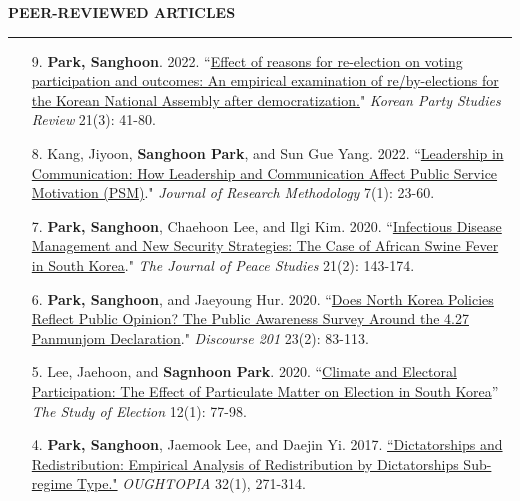 \documentclass[
  16,
]{article}
\begin{document}
\begin{large}{\bf PEER-REVIEWED ARTICLES}
  \vspace{3pt}
  \hrule
\end{large}
  \begin{itemize}
    \item[9.] \textbf{Park, Sanghoon}. 2022. ``\href{http://www.partystudies.or.kr/contents/bbs/bbs_list.html?bbs_cls_cd=004003}{Effect of reasons for re-election on voting participation and outcomes: An empirical examination of re/by-elections for the Korean National Assembly after democratization.}"  \textit{Korean Party Studies Review} 21(3): 41-80. 
\item[8.] Kang, Jiyoon, \textbf{Sanghoon Park}, and Sun Gue Yang. 2022. ``\href{http://basicdata.kr/board/read/journals/146/}{Leadership in Communication:
How Leadership and Communication Affect Public Service Motivation (PSM)}." \textit{Journal of Research Methodology} 7(1): 23-60.
\item[7.] \textbf{Park, Sanghoon}, Chaehoon Lee, and Ilgi Kim. 2020. ``\href{https://www.earticle.net/Journal/Issues/511/28448}{Infectious Disease Management and New Security Strategies: The Case of African Swine Fever in South Korea}." \textit{The Journal of Peace Studies} 21(2): 143-174.
\item[6.] \textbf{Park, Sanghoon}, and Jaeyoung Hur. 2020. ``\href{http://www.discourse201.org/html/sub05_01.asp}{Does North Korea Policies Reflect Public Opinion? The Public Awareness Survey Around the 4.27 Panmunjom Declaration}." \textit{Discourse 201} 23(2): 83-113.
\item[5.] Lee, Jaehoon, and \textbf{Sagnhoon Park}. 2020. ``\href{https://m.nec.go.kr/portal/cmm/fms/FileDown.do?atchFileId=5d0ffae936edc42f3b4e864801f86a0f4096c44da03fede418b94067e8f9d0ea&fileSn=1&bbsId=&searchYear=}{Climate and Electoral Participation: The Effect of Particulate Matter on Election in South Korea}'' \textit{The Study of Election} 12(1): 77-98.  
\item[4.] \textbf{Park, Sanghoon}, Jaemook Lee, and Daejin Yi. 2017. \href{http://www.dbpia.co.kr/Journal/ArticleDetail/NODE07183479?TotalCount=1&Seq=1&q=%5B%EB%8F%85%EC%9E%AC%EA%B5%AD%EA%B0%80%EC%99%80%20%EC%9E%AC%EB%B6%84%EB%B0%B0%C2%A7coldb%C2%A72%C2%A751%C2%A73%5D&searchWord=%EC%A0%84%EC%B2%B4%3D%5E%24%EB%8F%85%EC%9E%AC%EA%B5%AD%EA%B0%80%EC%99%80%20%EC%9E%AC%EB%B6%84%EB%B0%B0%5E*&Multimedia=0&isIdentifyAuthor=0&Collection=0&SearchAll=%EB%8F%85%EC%9E%AC%EA%B5%AD%EA%B0%80%EC%99%80%20%EC%9E%AC%EB%B6%84%EB%B0%B0&isFullText=0&specificParam=0&SearchMethod=0&Sort=1&SortType=desc&Page=1&PageSize=20#}{``Dictatorships and Redistribution: Empirical Analysis of Redistribution by Dictatorships Sub-regime Type."} \textit{OUGHTOPIA} 32(1), 271-314.

\end{itemize}
\end{document}
